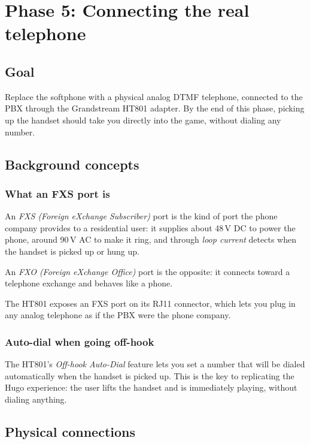 \chapter{Phase 5: Connecting the real telephone}

\section{Goal}

Replace the softphone with a physical analog DTMF telephone, connected to the PBX through the Grandstream HT801 adapter. By the end of this phase, picking up the handset should take you directly into the game, without dialing any number.

\section{Background concepts}

\subsection{What an FXS port is}

An \emph{FXS (Foreign eXchange Subscriber)} port is the kind of port the phone company provides to a residential user: it supplies about 48\,V DC to power the phone, around 90\,V AC to make it ring, and through \emph{loop current} detects when the handset is picked up or hung up.

An \emph{FXO (Foreign eXchange Office)} port is the opposite: it connects toward a telephone exchange and behaves like a phone.

The HT801 exposes an FXS port on its RJ11 connector, which lets you plug in any analog telephone as if the PBX were the phone company.

\subsection{Auto-dial when going off-hook}

The HT801's \emph{Off-hook Auto-Dial} feature lets you set a number that will be dialed automatically when the handset is picked up. This is the key to replicating the Hugo experience: the user lifts the handset and is immediately playing, without dialing anything.

\section{Physical connections}

